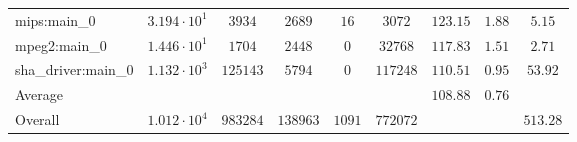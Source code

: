 \begin{tabular}{|l|c|c|c|c|c|c|c|c|}
mips:main\_0            & $ 3.194 \cdot 10^{1} $ & $ 3934   $ & $ 2689   $ & $ 16   $ & $ 3072   $ & $ 123.15      $ & $ 1.88    $ & $ 5.15    $ \\
mpeg2:main\_0           & $ 1.446 \cdot 10^{1} $ & $ 1704   $ & $ 2448   $ & $ 0    $ & $ 32768  $ & $ 117.83      $ & $ 1.51    $ & $ 2.71    $ \\
sha\_driver:main\_0     & $ 1.132 \cdot 10^{3} $ & $ 125143 $ & $ 5794   $ & $ 0    $ & $ 117248 $ & $ 110.51      $ & $ 0.95    $ & $ 53.92   $ \\
\hline
Average                 & $                    $ & $        $ & $        $ & $      $ & $        $ & $ 108.88      $ & $ 0.76    $ & $         $ \\
\hline
Overall                 & $ 1.012 \cdot 10^{4} $ & $ 983284 $ & $ 138963 $ & $ 1091 $ & $ 772072 $ & $             $ & $         $ & $ 513.28  $ \\
\hline
\end{tabular}
